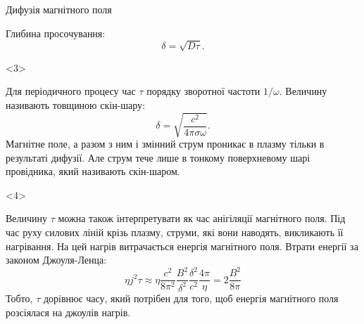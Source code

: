 \documentclass[]{beamer}
\begin{document}
\begin{frame}{Дифузія магнітного поля}{}
\begin{onlyenv}
\begin{block}{}
			Глибина просочування:
			\begin{equation*}
				\delta = \sqrt{D\tau}.
			\end{equation*}
		\end{block}
		\begin{center}
			
		\end{center}
	\end{onlyenv}
	\begin{onlyenv}
		\begin{block}{}\justifying
			Для періодичного процесу час $\tau$ порядку зворотної  частоти $1/\omega$. Величину називають товщиною \alert{скін-шару}:
			\begin{equation*}
				\delta = \sqrt{\frac{c^2}{4\pi\sigma\omega}}.
			\end{equation*}
			Магнітне поле, а разом з ним і змінний струм проникає в плазму тільки в результаті дифузії. Але струм тече лише в тонкому поверхневому шарі провідника, який називають \alert{скін-шаром}.
		\end{block}
	\end{onlyenv}
	\begin{onlyenv}
		\begin{block}{}\justifying
			Величину $\tau$ можна також інтерпретувати як час анігіляції магнітного поля. Під час руху
			силових ліній крізь плазму, струми, які вони наводять, викликають її нагрівання. На цей
			нагрів витрачається енергія магнітного поля. Втрати енергії за законом Джоуля-Ленца:
			\begin{equation*}
				\eta j^2 \tau \approx \eta \frac{c^2}{8\pi^2} \frac{B^2}{\delta^2} \frac{\delta^2}{c^2} \frac{4\pi}{\eta} = 2\frac{B^2}{8\pi}
			\end{equation*}
			Тобто, $\tau$ дорівнює часу, який потрібен для того, щоб енергія магнітного поля розсіялася на джоулів нагрів.
		\end{block}
	\end{onlyenv}
\end{frame}
\end{document}
